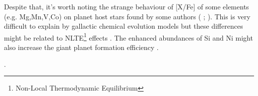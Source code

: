 \documentclass[dvips,12pt,a4paper]{report}
\begin{document}
{Despite that, it's worth noting the strange behaviour of [X/Fe] of some elements (e.g. Mg,Mn,V,Co) on planet host stars found by some authors (\citeauthor{Bodaghee-2003} \citeyear{Bodaghee-2003}; \citeauthor{Gilli-2006} \citeyear{Gilli-2006}). This is very difficult to explain by gallactic chemical evolution models but these differences might be related to NLTE\footnote{Non-Local Thermodynamic Equilibrium} effects \citep{Bodaghee-2003}. The enhanced abundances of Si and Ni might also increase the giant planet formation efficiency \citep{Robinson-2006}.

. %



}
\end{document}
